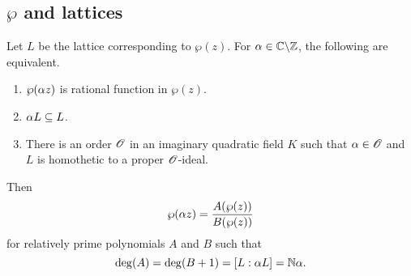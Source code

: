 \subsection{$\wp$ and lattices}
\begin{thm}
Let $L$ be the lattice corresponding to $\wp(z)$. For $\alpha\in \mathbb{C}\backslash \mathbb{Z}$, the following are equivalent.
\begin{enumerate}
\item $\wp(\alpha z)$ is  rational function in $\wp(z)$.
\item $\alpha L\subseteq L$.
\item There is an order $\mathscr{O}$ in an imaginary quadratic field $K$ such that $\alpha\in \mathscr{O}$ and $L$ is homothetic to a proper $\mathscr{O}$-ideal.
\end{enumerate}
Then 
\[
\wp(\alpha z)=\frac{A(\wp(z))}{B(\wp(z))}
\]
for relatively prime polynomials $A$ and $B$ such that 
\[
\deg(A)=\deg(B+1)=[L:\alpha L]=\mathbb{N}\alpha.
\]
\end{thm}
